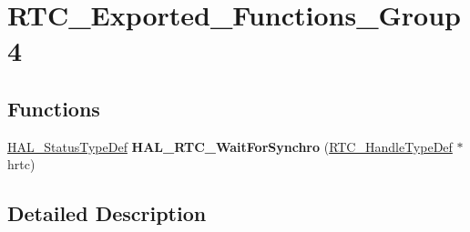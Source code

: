 \hypertarget{group___r_t_c___exported___functions___group4}{}\section{R\+T\+C\+\_\+\+Exported\+\_\+\+Functions\+\_\+\+Group4}
\label{group___r_t_c___exported___functions___group4}
\subsection*{Functions}
\begin{DoxyCompactItemize}
\item 
\mbox{\label{group___r_t_c___exported___functions___group4_ga62efc08017f7dc4db0bc72f7c68085ad}} 
\hyperlink{stm32f4xx__hal__def_8h_a63c0679d1cb8b8c684fbb0632743478f}{H\+A\+L\+\_\+\+Status\+Type\+Def} {\bfseries H\+A\+L\+\_\+\+R\+T\+C\+\_\+\+Wait\+For\+Synchro} (\hyperlink{struct_r_t_c___handle_type_def}{R\+T\+C\+\_\+\+Handle\+Type\+Def} $\ast$hrtc)
\end{DoxyCompactItemize}


\subsection{Detailed Description}
